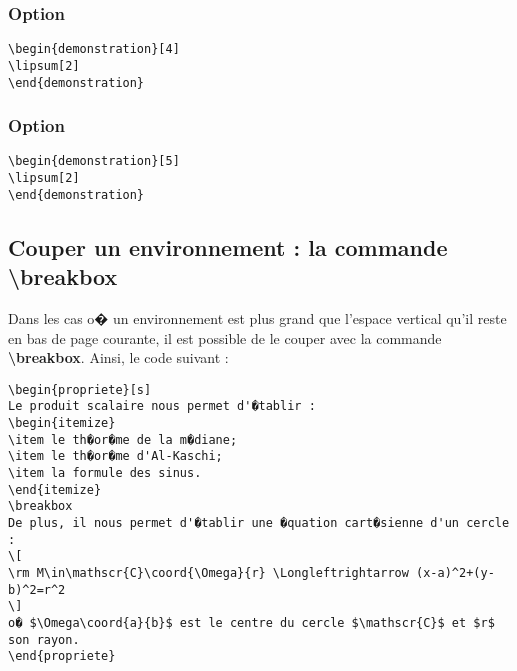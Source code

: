 \documentclass[ams,openany,10pt,presentation,latin1]{mathbook}
\begin{document}
\begin{demonstration}[3]
\lipsum[2]
\end{demonstration}

\subsubsection{Option  \fg}

\begin{lstlisting}
\begin{demonstration}[4]
\lipsum[2]
\end{demonstration}
\end{lstlisting}

\begin{demonstration}[4]
\lipsum[2]
\end{demonstration}

\subsubsection{Option  \fg}

\begin{lstlisting}
\begin{demonstration}[5]
\lipsum[2]
\end{demonstration}
\end{lstlisting}

\begin{demonstration}[5]
\lipsum[2]
\end{demonstration}

\subsection{Couper un environnement : la commande \textbackslash breakbox}

Dans les cas o� un environnement est plus grand que l'espace vertical qu'il reste en bas de page courante, il est possible de le couper avec la commande \textbf{\textbackslash breakbox}. Ainsi, le code suivant :

\begin{lstlisting}
\begin{propriete}[s]
Le produit scalaire nous permet d'�tablir :
\begin{itemize}
\item le th�or�me de la m�diane;
\item le th�or�me d'Al-Kaschi;
\item la formule des sinus.
\end{itemize}
\breakbox
De plus, il nous permet d'�tablir une �quation cart�sienne d'un cercle :
\[
\rm M\in\mathscr{C}\coord{\Omega}{r} \Longleftrightarrow (x-a)^2+(y-b)^2=r^2
\]
o� $\Omega\coord{a}{b}$ est le centre du cercle $\mathscr{C}$ et $r$ son rayon.
\end{propriete}
\end{lstlisting}
\end{document}
